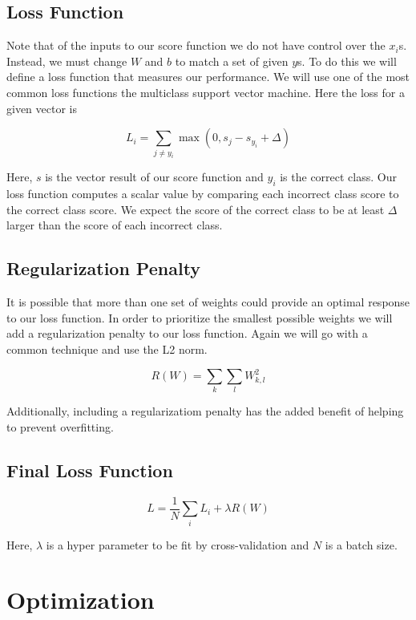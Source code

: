 \documentclass[]{report}
\begin{document}
\section{Loss Function}\label{loss-function}

Note that of the inputs to our score function we do not have control
over the \(x_i\)s. Instead, we must change \(W\) and \(b\) to match a
set of given \(y\)s. To do this we will define a loss function that
measures our performance. We will use one of the most common loss
functions the multiclass support vector machine. Here the loss for a
given vector is

\[L_i=\sum_{j\neq y_i}\max(0,s_j-s_{y_i}+\Delta)\]

Here, \(s\) is the vector result of our score function and \(y_i\) is
the correct class. Our loss function computes a scalar value by
comparing each incorrect class score to the correct class score. We
expect the score of the correct class to be at least \(\Delta\) larger
than the score of each incorrect class.

\section{Regularization Penalty}\label{regularization-penalty}

It is possible that more than one set of weights could provide an
optimal response to our loss function. In order to prioritize the
smallest possible weights we will add a regularization penalty to our
loss function. Again we will go with a common technique and use the L2
norm.

\[R(W)=\sum_k\sum_lW^2_{k,l}\]

Additionally, including a regularizatiom penalty has the added benefit
of helping to prevent overfitting.

\section{Final Loss Function}\label{final-loss-function}

\[L=\frac{1}{N}\sum_iL_i+\lambda R(W)\]

Here, \(\lambda\) is a hyper parameter to be fit by cross-validation and
\(N\) is a batch size.

\chapter{Optimization}\label{optimization}
\end{document}
